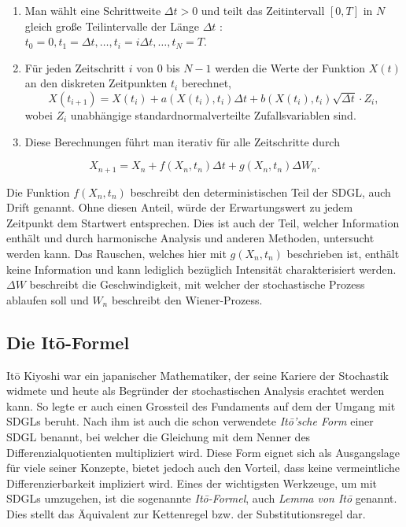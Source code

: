 \begin{enumerate}
	\item Man wählt eine Schrittweite $ \Delta t > 0 $ und teilt das Zeitintervall $ [0, T] $ in $ N $ gleich große Teilintervalle der Länge $ \Delta t$ : $ t_0 = 0, t_1 = \Delta t, \dots, t_i = i\Delta t, \dots, t_N = T $.
	\item Für jeden Zeitschritt $ i $ von $ 0 $ bis $ N-1 $ werden die Werte der Funktion $ X(t) $ an den diskreten Zeitpunkten $ t_i $ berechnet,
	\begin{equation}
		X(t_{i+1}) = X(t_i) + a(X(t_i), t_i) \Delta t + b(X(t_i), t_i) \sqrt{\Delta t} \cdot Z_i,
	\end{equation}
	wobei $ Z_i $ unabhängige standardnormalverteilte Zufallsvariablen sind.
	\item Diese Berechnungen führt man iterativ für alle Zeitschritte durch
\end{enumerate}

\begin{equation}
	X_{n+1} = X_n + f(X_n,t_n) \Delta t + g(X_n,t_n) \Delta W_n .
\end{equation}

Die Funktion $ f(X_n,t_n) $ beschreibt den deterministischen Teil der SDGL, auch Drift genannt. Ohne diesen Anteil, würde der Erwartungswert zu jedem Zeitpunkt dem Startwert entsprechen. Dies ist auch der Teil, welcher Information enthält und durch harmonische Analysis und anderen Methoden, untersucht werden kann. Das Rauschen, welches hier mit $ g(X_n,t_n) $ beschrieben ist, enthält keine Information und kann lediglich bezüglich Intensität charakterisiert werden. $ \Delta W $ beschreibt die Geschwindigkeit, mit welcher der stochastische Prozess ablaufen soll und $ W_n $  beschreibt den Wiener-Prozess.



\subsection{Die Itō-Formel\label{brown:ito}}

Itō Kiyoshi war ein japanischer Mathematiker, der seine Kariere der Stochastik widmete und heute als Begründer der stochastischen Analysis erachtet werden kann. So legte er auch einen Grossteil des Fundaments auf dem der Umgang mit SDGLs beruht. 
Nach ihm ist auch die schon verwendete \textit{Itō'sche Form} einer SDGL benannt, bei welcher die Gleichung mit dem Nenner des Differenzialquotienten multipliziert wird. Diese Form eignet sich als Ausgangslage für viele seiner Konzepte, bietet jedoch auch den Vorteil, dass keine vermeintliche Differenzierbarkeit impliziert wird.
Eines der wichtigsten Werkzeuge, um mit SDGLs umzugehen, ist die sogenannte \textit{Itō-Formel}, auch \textit{Lemma von Itō} genannt. Dies stellt das Äquivalent zur Kettenregel bzw. der Substitutionsregel dar. %


